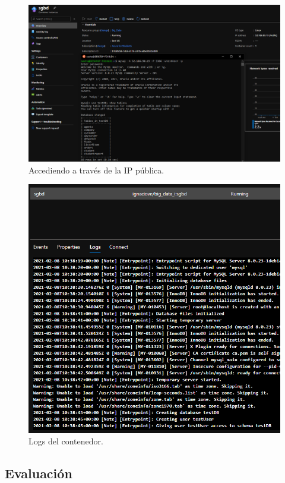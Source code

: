 \begin{figure}[H]\center\includegraphics[width=.95\linewidth]{img/sgbd/s7.png}\caption{Accediendo a través de la IP pública.}\end{figure}

\begin{figure}[H]\center\includegraphics[width=.95\linewidth]{img/sgbd/s8.png}\caption{Logs del contenedor.}\end{figure}

\newpage

\subsection{Evaluación}

